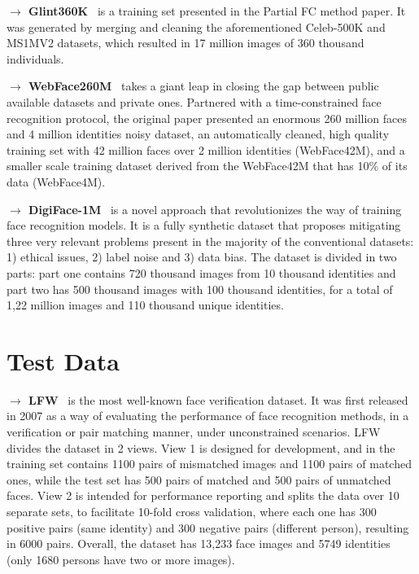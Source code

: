 \documentclass[class=report, crop=false, a4paper, 12pt]{standalone}
\begin{document}
\begin{appendix}
\vspace{0.7\baselineskip}
\noindent\textbf{$\rightarrow$ Glint360K}~\autocite{anPartialFCTraining2021} is a training set presented in the Partial FC method paper. It was generated by merging and cleaning the aforementioned Celeb-500K and MS1MV2 datasets, which resulted in 17 million images of 360 thousand individuals.

\vspace{0.7\baselineskip}
\noindent\textbf{$\rightarrow$ WebFace260M}~\autocite{zhuWebFace260MBenchmarkUnveiling2021} takes a giant leap in closing the gap between public available datasets and private ones. Partnered with a time-constrained face recognition protocol, the original paper presented an enormous 260 million faces and 4 million identities noisy dataset, an automatically cleaned, high quality training set with 42 million faces over 2 million identities (WebFace42M), and a smaller scale training dataset derived from the WebFace42M that has 10\% of its data (WebFace4M).

\vspace{0.7\baselineskip}
\noindent\textbf{$\rightarrow$ DigiFace-1M}~\autocite{baeDigiFace1MMillionDigital2023} is a novel approach that revolutionizes the way of training face recognition models. It is a fully synthetic dataset that proposes mitigating three very relevant problems present in the majority of the conventional datasets: 1) ethical issues, 2) label noise and 3) data bias. The dataset is divided in two parts: part one contains 720 thousand images from 10 thousand identities and part two has 500 thousand images with 100 thousand identities, for a total of 1,22 million images and 110 thousand unique identities.



\chapter{Test Data}\label{appendix:test_data_appendix}
\noindent\textbf{$\rightarrow$ LFW}~\autocite{huangLabeledFacesWild} is the most well-known face verification dataset. It was first released in 2007 as a way of evaluating the performance of face recognition methods, in a verification or pair matching manner, under unconstrained scenarios. LFW divides the dataset in 2 views. View 1 is designed for development, and in the training set contains 1100 pairs of mismatched images and 1100 pairs of matched ones, while the test set has 500 pairs of matched and 500 pairs of unmatched faces. View 2 is intended for performance reporting and splits the data over 10 separate sets, to facilitate 10-fold cross validation, where each one has 300 positive pairs (same identity) and 300 negative pairs (different person), resulting in 6000 pairs. Overall, the dataset has 13,233 face images and 5749 identities (only 1680 persons have two or more images).


\end{appendix}
\end{document}
